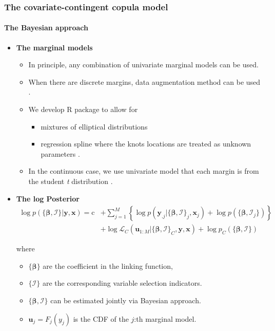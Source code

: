 \documentclass{beamer}
\begin{document}
\begin{frame}[allowframebreaks]
\frametitle{The covariate-contingent copula model}
\framesubtitle{The Bayesian approach}
\begin{itemize}
\item \textbf{The marginal models}
    \begin{itemize}
    \item In principle, any combination of univariate marginal models can be
      used.
    \item When there are discrete margins, data augmentation method can be used
      {\color{blue}\citep{smith2012estimation}}.

    \item We develop R package to allow for
      \begin{itemize}
      \item mixtures of elliptical distributions {\color{blue}\citep{li2010flexible}}
      \item regression spline where the knots locations are treated as unknown parameters
        {\color{blue}\citep{li2013efficient}}.
      \end{itemize}


    \item In the continuous case, we use univariate model that each margin is
      from the student \emph{t} distribution .
    \end{itemize}

  \item \textbf{The log Posterior}
\[
\begin{split}\log p(\{\bm{\beta},\bm{\mathcal{I}}\}|\bm{y},\bm{x})=
  \mathrm{c}&+\sum\nolimits _{j=1}^{M}\left\{\log
  p(\bm{y}_{.j}|\{\bm{\beta},\bm{\mathcal{I}}\}_{j},\bm{x}_{j}) + \log p(\{\bm{\beta},\bm{\mathcal{I}}_j\}) \right\}\\
 & +\log\mathcal{L}_{C}(\bm{u}_{1:M}|\{\bm{\beta},\bm{\mathcal{I}}\}_{C},\bm{y},\bm{x})+
 \log p_C(\{\bm{\beta},\bm{\mathcal{I}}\})
\end{split}
\]

where
\begin{itemize}
\item $\{\bm{\beta}\}$ are the coefficient in the linking function,
\item $\{\bm{\mathcal{I}}\}$ are the corresponding variable selection indicators.
\item $\{\bm{\beta},\bm{\mathcal{I}}\}$ can be estimated jointly via Bayesian approach.
\item $\bm{u}_{j}=F_{j}(y_{j})$ is the CDF of the $j$:th marginal model.
\end{itemize}


\end{itemize}
\end{frame}
\end{document}
